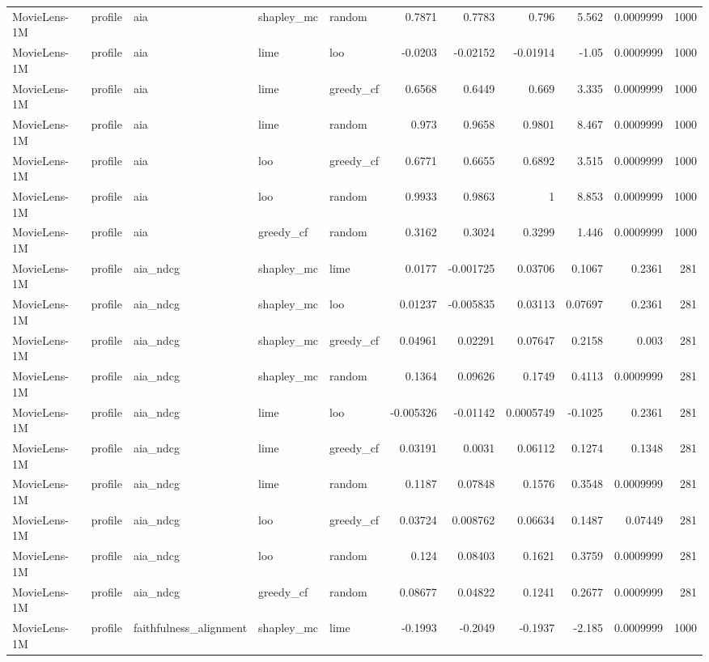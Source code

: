 \begin{table}[t]
\begin{tabular}{lllllrrrrrr}
MovieLens-1M & profile & aia & shapley\_mc & random & 0.7871 & 0.7783 & 0.796 & 5.562 & 0.0009999 & 1000 \\
MovieLens-1M & profile & aia & lime & loo & -0.0203 & -0.02152 & -0.01914 & -1.05 & 0.0009999 & 1000 \\
MovieLens-1M & profile & aia & lime & greedy\_cf & 0.6568 & 0.6449 & 0.669 & 3.335 & 0.0009999 & 1000 \\
MovieLens-1M & profile & aia & lime & random & 0.973 & 0.9658 & 0.9801 & 8.467 & 0.0009999 & 1000 \\
MovieLens-1M & profile & aia & loo & greedy\_cf & 0.6771 & 0.6655 & 0.6892 & 3.515 & 0.0009999 & 1000 \\
MovieLens-1M & profile & aia & loo & random & 0.9933 & 0.9863 & 1 & 8.853 & 0.0009999 & 1000 \\
MovieLens-1M & profile & aia & greedy\_cf & random & 0.3162 & 0.3024 & 0.3299 & 1.446 & 0.0009999 & 1000 \\
MovieLens-1M & profile & aia\_ndcg & shapley\_mc & lime & 0.0177 & -0.001725 & 0.03706 & 0.1067 & 0.2361 & 281 \\
MovieLens-1M & profile & aia\_ndcg & shapley\_mc & loo & 0.01237 & -0.005835 & 0.03113 & 0.07697 & 0.2361 & 281 \\
MovieLens-1M & profile & aia\_ndcg & shapley\_mc & greedy\_cf & 0.04961 & 0.02291 & 0.07647 & 0.2158 & 0.003 & 281 \\
MovieLens-1M & profile & aia\_ndcg & shapley\_mc & random & 0.1364 & 0.09626 & 0.1749 & 0.4113 & 0.0009999 & 281 \\
MovieLens-1M & profile & aia\_ndcg & lime & loo & -0.005326 & -0.01142 & 0.0005749 & -0.1025 & 0.2361 & 281 \\
MovieLens-1M & profile & aia\_ndcg & lime & greedy\_cf & 0.03191 & 0.0031 & 0.06112 & 0.1274 & 0.1348 & 281 \\
MovieLens-1M & profile & aia\_ndcg & lime & random & 0.1187 & 0.07848 & 0.1576 & 0.3548 & 0.0009999 & 281 \\
MovieLens-1M & profile & aia\_ndcg & loo & greedy\_cf & 0.03724 & 0.008762 & 0.06634 & 0.1487 & 0.07449 & 281 \\
MovieLens-1M & profile & aia\_ndcg & loo & random & 0.124 & 0.08403 & 0.1621 & 0.3759 & 0.0009999 & 281 \\
MovieLens-1M & profile & aia\_ndcg & greedy\_cf & random & 0.08677 & 0.04822 & 0.1241 & 0.2677 & 0.0009999 & 281 \\
MovieLens-1M & profile & faithfulness\_alignment & shapley\_mc & lime & -0.1993 & -0.2049 & -0.1937 & -2.185 & 0.0009999 & 1000 \\

\end{tabular}
\end{table}
